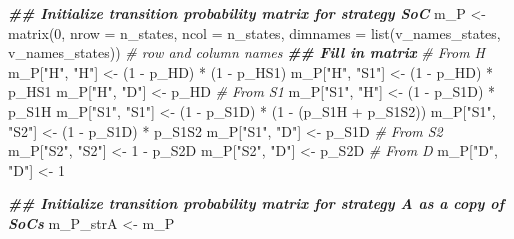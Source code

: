 \documentclass[
]{article}
\newenvironment{Shaded}{\begin{snugshade}}{\end{snugshade}}
\newcommand{\AttributeTok}[1]{\textcolor[rgb]{0.77,0.63,0.00}{#1}}
\newcommand{\CommentTok}[1]{\textcolor[rgb]{0.56,0.35,0.01}{\textit{#1}}}
\newcommand{\DecValTok}[1]{\textcolor[rgb]{0.00,0.00,0.81}{#1}}
\newcommand{\DocumentationTok}[1]{\textcolor[rgb]{0.56,0.35,0.01}{\textbf{\textit{#1}}}}
\newcommand{\FunctionTok}[1]{\textcolor[rgb]{0.00,0.00,0.00}{#1}}
\newcommand{\NormalTok}[1]{#1}
\newcommand{\OtherTok}[1]{\textcolor[rgb]{0.56,0.35,0.01}{#1}}
\newcommand{\SpecialCharTok}[1]{\textcolor[rgb]{0.00,0.00,0.00}{#1}}
\newcommand{\StringTok}[1]{\textcolor[rgb]{0.31,0.60,0.02}{#1}}
\begin{document}
\begin{Shaded}
\begin{Highlighting}[]
\DocumentationTok{\#\# Initialize transition probability matrix for strategy SoC}
\NormalTok{m\_P }\OtherTok{\textless{}{-}} \FunctionTok{matrix}\NormalTok{(}\DecValTok{0}\NormalTok{, }
              \AttributeTok{nrow =}\NormalTok{ n\_states, }\AttributeTok{ncol =}\NormalTok{ n\_states, }
              \AttributeTok{dimnames =} \FunctionTok{list}\NormalTok{(v\_names\_states, v\_names\_states)) }\CommentTok{\# row and column names}
\DocumentationTok{\#\# Fill in matrix}
\CommentTok{\# From H}
\NormalTok{m\_P[}\StringTok{"H"}\NormalTok{, }\StringTok{"H"}\NormalTok{]   }\OtherTok{\textless{}{-}}\NormalTok{ (}\DecValTok{1} \SpecialCharTok{{-}}\NormalTok{ p\_HD) }\SpecialCharTok{*}\NormalTok{ (}\DecValTok{1} \SpecialCharTok{{-}}\NormalTok{ p\_HS1)}
\NormalTok{m\_P[}\StringTok{"H"}\NormalTok{, }\StringTok{"S1"}\NormalTok{]  }\OtherTok{\textless{}{-}}\NormalTok{ (}\DecValTok{1} \SpecialCharTok{{-}}\NormalTok{ p\_HD) }\SpecialCharTok{*}\NormalTok{ p\_HS1}
\NormalTok{m\_P[}\StringTok{"H"}\NormalTok{, }\StringTok{"D"}\NormalTok{]   }\OtherTok{\textless{}{-}}\NormalTok{ p\_HD}
\CommentTok{\# From S1}
\NormalTok{m\_P[}\StringTok{"S1"}\NormalTok{, }\StringTok{"H"}\NormalTok{]  }\OtherTok{\textless{}{-}}\NormalTok{ (}\DecValTok{1} \SpecialCharTok{{-}}\NormalTok{ p\_S1D) }\SpecialCharTok{*}\NormalTok{ p\_S1H}
\NormalTok{m\_P[}\StringTok{"S1"}\NormalTok{, }\StringTok{"S1"}\NormalTok{] }\OtherTok{\textless{}{-}}\NormalTok{ (}\DecValTok{1} \SpecialCharTok{{-}}\NormalTok{ p\_S1D) }\SpecialCharTok{*}\NormalTok{ (}\DecValTok{1} \SpecialCharTok{{-}}\NormalTok{ (p\_S1H }\SpecialCharTok{+}\NormalTok{ p\_S1S2))}
\NormalTok{m\_P[}\StringTok{"S1"}\NormalTok{, }\StringTok{"S2"}\NormalTok{] }\OtherTok{\textless{}{-}}\NormalTok{ (}\DecValTok{1} \SpecialCharTok{{-}}\NormalTok{ p\_S1D) }\SpecialCharTok{*}\NormalTok{ p\_S1S2}
\NormalTok{m\_P[}\StringTok{"S1"}\NormalTok{, }\StringTok{"D"}\NormalTok{]  }\OtherTok{\textless{}{-}}\NormalTok{ p\_S1D}
\CommentTok{\# From S2}
\NormalTok{m\_P[}\StringTok{"S2"}\NormalTok{, }\StringTok{"S2"}\NormalTok{] }\OtherTok{\textless{}{-}} \DecValTok{1} \SpecialCharTok{{-}}\NormalTok{ p\_S2D}
\NormalTok{m\_P[}\StringTok{"S2"}\NormalTok{, }\StringTok{"D"}\NormalTok{]  }\OtherTok{\textless{}{-}}\NormalTok{ p\_S2D}
\CommentTok{\# From D}
\NormalTok{m\_P[}\StringTok{"D"}\NormalTok{, }\StringTok{"D"}\NormalTok{]   }\OtherTok{\textless{}{-}} \DecValTok{1}

\DocumentationTok{\#\# Initialize transition probability matrix for strategy A as a copy of SoC\textquotesingle{}s}
\NormalTok{m\_P\_strA }\OtherTok{\textless{}{-}}\NormalTok{ m\_P}
\end{Highlighting}
\end{Shaded}
\end{document}
